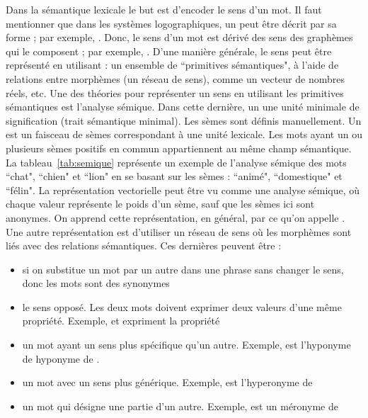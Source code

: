 \documentclass{KodeBook}
\begin{document}
Dans la sémantique lexicale le but est d'encoder le sens d'un mot. 
Il faut mentionner que dans les systèmes logographiques, un  peut être décrit par sa forme ; par exemple, .
Donc, le sens d'un mot est dérivé des sens des graphèmes qui le composent ; par exemple, .
D'une manière générale, le sens peut être représenté en utilisant : un ensemble de ``primitives sémantiques", à l'aide de relations entre morphèmes (un réseau de sens), comme un vecteur de nombres réels, etc.
Une des théories pour représenter un sens en utilisant les primitives sémantiques est l'analyse sémique. 
Dans cette dernière, un  une unité minimale de signification (trait sémantique minimal). 
Les sèmes sont définis manuellement. 
Un  est un faisceau de sèmes correspondant à une unité lexicale. 
Les mots ayant un ou plusieurs sèmes positifs en commun appartiennent au même champ sémantique.  
La tableau~\ref{tab:semique} représente un exemple de l'analyse sémique des mots ``chat", ``chien" et ``lion" en se basant sur les sèmes : ``animé", ``domestique" et ``félin". 
La représentation vectorielle peut être vu comme une analyse sémique, où chaque valeur représente le poids d'un sème, sauf que les sèmes ici sont anonymes. 
On apprend cette représentation, en général, par ce qu'on appelle . 
Une autre représentation est d'utiliser un réseau de sens où les morphèmes sont liés avec des relations sémantiques.
Ces dernières peuvent être : 
\begin{itemize}
	\item {} si on substitue un mot par un autre dans une phrase sans changer le sens, donc les mots sont des synonymes
	\item {} le sens opposé. Les deux mots doivent exprimer deux valeurs d'une même propriété. Exemple,  et  expriment la propriété 
	\item {} un mot ayant un sens plus spécifique qu'un autre. Exemple,  est l'hyponyme de  hyponyme de . 
	\item {} un mot avec un sens plus générique. Exemple,  est l'hyperonyme de 
	\item {} un mot qui désigne une partie d'un autre. Exemple,  est un méronyme de 
\end{itemize}
\end{document}
